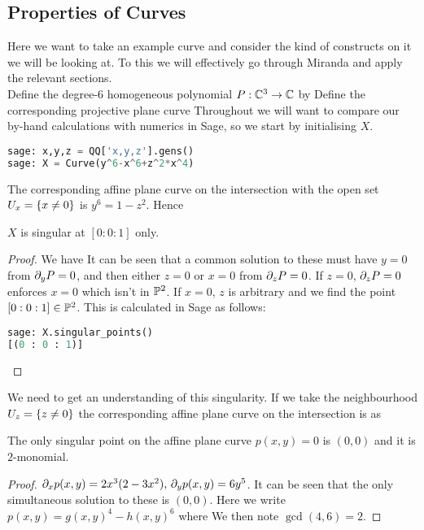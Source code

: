 \documentclass{article}
\begin{document}
\subsection{Properties of Curves}
Here we want to take an example curve and consider the kind of constructs on it we will be looking at. To this we will effectively go through Miranda \cite{Miranda1995} and apply the relevant sections. \\
Define the degree-$6$ homogeneous polynomial $P:\mathbb{C}^3 \to \mathbb{C}$ by 
Define the corresponding projective plane curve 
Throughout we will want to compare our by-hand calculations with numerics in Sage, so we start by initialising $X$. 
\begin{lstlisting}[language=Python,frame=single]
sage: x,y,z = QQ['x,y,z'].gens()
sage: X = Curve(y^6-x^6+z^2*x^4)
\end{lstlisting}
The corresponding affine plane curve on the intersection with the open set $U_x = \left\{ x \neq 0 \right\}$ is $y^6 = 1-z^2$. Hence 
\begin{prop}
	$X$ is singular at $[0:0:1]$ only. 
\end{prop}
\begin{proof}
	We have 
It can be seen that a common solution to these must have $y=0$ from $\partial_y P=0$, and then either $z=0$  or $x=0$ from $\partial_zP=0$. If $z=0$, $\partial_zP=0$ enforces $x=0$ which isn't in $\mathbb{P}^2$. If $x=0$, $z$ is arbitrary and we find the point $[0:0:1] \in \mathbb{P}^2$. This is calculated in Sage as follows:
\begin{lstlisting}[language=Python,frame=single]
sage: X.singular_points()
[(0 : 0 : 1)]
\end{lstlisting}
\end{proof}
We need to get an understanding of this singularity. If we take the neighbourhood $U_z = \left\{ z \neq 0 \right\}$ the corresponding affine plane curve on the intersection is 
as 
\begin{prop}
	The only singular point on the affine plane curve $p(x,y)=0$ is $(0,0)$ and it is $2$-monomial. 
\end{prop}
\begin{proof}
	$\partial_x p(x,y) = 2x^3(2-3x^2), \, \partial_y p(x,y) = 6y^5$. It can be seen that the only simultaneous solution to these is  $(0,0)$. Here we write $p(x,y)=g(x,y)^4 - h(x,y)^6$ where
We then note $\gcd(4,6) = 2$. 
\end{proof}
\end{document}

